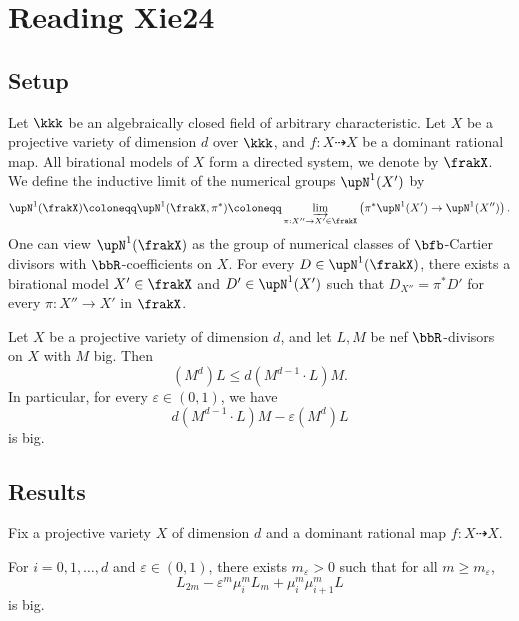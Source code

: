 \section{Reading Xie24}


\subsection{Setup}

  Let $\kkk$ be an algebraically closed field of arbitrary characteristic.
  Let $X$ be a projective variety of dimension $d$ over $\kkk$, and $f: X \dashrightarrow X$ be a dominant rational map.
  All birational models of $X$ form a directed system, we denote by $\frakX$.
  We define the inductive limit of the numerical groups $\upN^1(X')$ by 
  \[ \upN^1(\frakX) \coloneqq \upN^1(\frakX,\pi^*) \coloneqq \varinjlim_{\pi:X'' \to X' \in \frakX} \left( \pi^* \upN^1(X') \to \upN^1(X'') \right). \]
  One can view $\upN^1(\frakX)$ as the group of numerical classes of $\bfb$-Cartier divisors with $\bbR$-coefficients on $X$.
  For every $D \in \upN^1(\frakX)$, there exists a birational model $X' \in \frakX$ and $D' \in \upN^1(X')$ such that $D_{X''} = \pi^* D'$ for every $\pi: X'' \to X'$ in $\frakX$.
  
  

  \begin{theorem}
    Let $X$ be a projective variety of dimension $d$, and let $L,M$ be nef $\bbR$-divisors on $X$ with $M$ big. 
    Then 
    \[ (M^d) L \leq d (M^{d-1} \cdot L) M. \]
    In particular, for every $\varepsilon \in (0, 1)$, we have
    \[ d (M^{d-1} \cdot L) M - \varepsilon (M^d) L \]
    is big.
  \end{theorem}

\subsection{Results}

  Fix a projective variety $X$ of dimension $d$ and a dominant rational map $f: X \dashrightarrow X$. 

  \begin{mainthm}\label{thm:recursive_inequality}
    For $i = 0, 1, \ldots, d$ and $\varepsilon \in (0, 1)$, there exists $m_\varepsilon > 0$ such that for all $m \geq m_\varepsilon$,
    \[  L_{2m} - \varepsilon^m \mu_i^m L_m + \mu_i^m \mu_{i+1}^m L \]
    is big.
  \end{mainthm}

